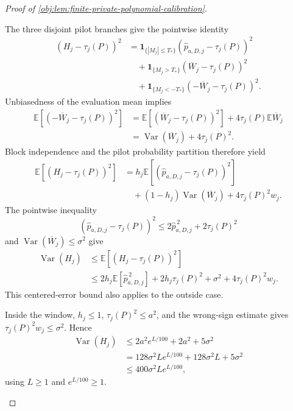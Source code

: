 \begin{proof}[Proof of \cref{obj:lem:finite-private-polynomial-calibration}]
\begin{enumerate}
The three disjoint pilot branches give the pointwise identity
\[
\begin{aligned}
(H_j-\tau_j(P))^2
&=\mathbf1_{\{|M_j|\le T_*\}}
       (\widehat p_{a,D,j}-\tau_j(P))^2\\
&\quad+\mathbf1_{\{M_j>T_*\}}
       (\overline W_j-\tau_j(P))^2\\
&\quad+\mathbf1_{\{M_j<-T_*\}}
       (-\overline W_j-\tau_j(P))^2.
\end{aligned}
\]
Unbiasedness of the evaluation mean implies
\[
\begin{aligned}
\mathbb E[(-\overline W_j-\tau_j(P))^2]
&=\mathbb E[(\overline W_j-\tau_j(P))^2]
   +4\tau_j(P)\mathbb E\overline W_j\\
&=\operatorname{Var}(\overline W_j)+4\tau_j(P)^2.
\end{aligned}
\]
Block independence and the pilot probability partition therefore yield
\[
\begin{aligned}
\mathbb E[(H_j-\tau_j(P))^2]
&=h_j\mathbb E[(\widehat p_{a,D,j}-\tau_j(P))^2]\\
&\quad+(1-h_j)\operatorname{Var}(\overline W_j)
       +4\tau_j(P)^2w_j.
\end{aligned}
\]
The pointwise inequality
\[
(\widehat p_{a,D,j}-\tau_j(P))^2
\le2\widehat p_{a,D,j}^{\,2}+2\tau_j(P)^2
\]
and \(\operatorname{Var}(\overline W_j)\le\sigma^2\) give
\[
\begin{aligned}
\operatorname{Var}(H_j)
&\le\mathbb E[(H_j-\tau_j(P))^2]\\
&\le2h_j\mathbb E[\widehat p_{a,D,j}^{\,2}]
     +2h_j\tau_j(P)^2+\sigma^2+4\tau_j(P)^2w_j.
\end{aligned}
\]
This centered-error bound also applies to the outside case.

Inside the window, \(h_j\le1\), \(\tau_j(P)^2\le a^2\), and the wrong-sign estimate gives \(\tau_j(P)^2w_j\le\sigma^2\). Hence
\[
\begin{aligned}
\operatorname{Var}(H_j)
&\le2a^2e^{L/100}+2a^2+5\sigma^2\\
&=128\sigma^2Le^{L/100}+128\sigma^2L+5\sigma^2\\
&\le400\sigma^2Le^{L/100},
\end{aligned}
\]
using \(L\ge1\) and \(e^{L/100}\ge1\).


\end{enumerate}
\end{proof}
